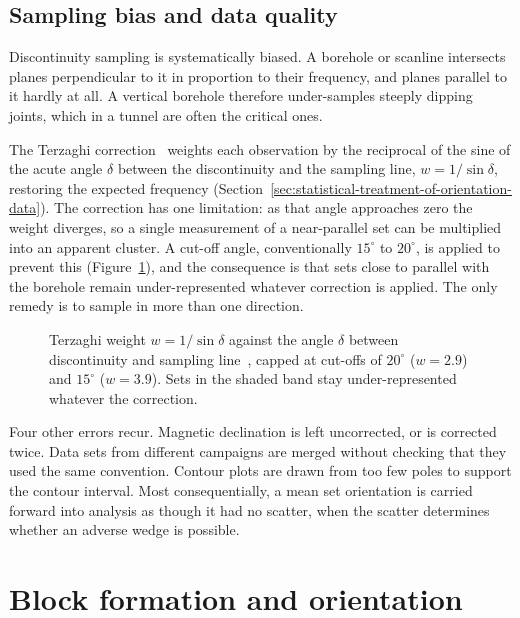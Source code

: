 \subsection{Sampling bias and data quality}
\label{sec:sampling-bias}

Discontinuity sampling is systematically biased. A borehole or scanline
intersects planes perpendicular to it in proportion to their frequency, and
planes parallel to it hardly at all. A vertical borehole therefore
under-samples steeply dipping joints, which in a tunnel are often the
critical ones.

The Terzaghi correction~\citep{terzaghi1965sources} weights each observation by the reciprocal of the
sine of the acute angle $\delta$ between the discontinuity and the sampling
line, $w = 1/\sin\delta$, restoring the expected frequency
(Section~\ref{sec:statistical-treatment-of-orientation-data}). The correction has one limitation: as that angle approaches zero
the weight diverges, so a single measurement of a near-parallel set can be
multiplied into an apparent cluster. A cut-off angle, conventionally
$15^\circ$ to $20^\circ$, is applied to prevent this
(Figure~\ref{fig:terzaghi-weight}), and the
consequence is that sets close to parallel with the borehole remain
under-represented whatever correction is applied. The only remedy
is to sample in more than one direction.

\begin{figure}[htbp]
\centering
{}
\caption{Terzaghi weight $w = 1/\sin\delta$ against the angle $\delta$ between discontinuity and sampling line~\citep{terzaghi1965sources}, capped at cut-offs of $20^\circ$ ($w = 2.9$) and $15^\circ$ ($w = 3.9$). Sets in the shaded band stay under-represented whatever the correction.}
\label{fig:terzaghi-weight}
\end{figure}

Four other errors recur. Magnetic declination is left uncorrected, or is
corrected twice. Data sets from different campaigns are merged without checking
that they used the same convention. Contour plots are drawn from too few poles to
support the contour interval. Most consequentially, a mean set
orientation is carried forward into analysis as though it had no scatter, when
the scatter determines whether an adverse wedge is possible.

\section{Block formation and orientation}
\label{sec:block-formation}

